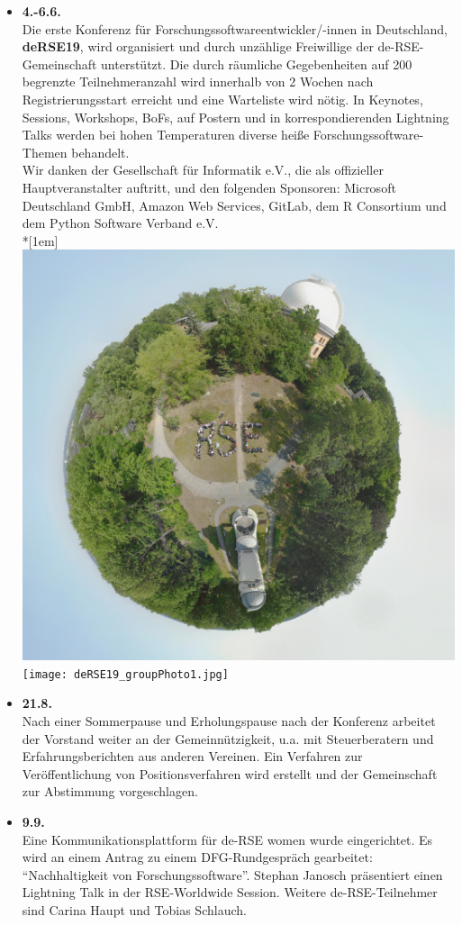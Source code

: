 \begin{itemize}
 \item \textbf{4.-6.6.}\\
 Die erste Konferenz für Forschungssoftwareentwickler/-innen in Deutschland, \textbf{deRSE19}, wird organisiert und durch unzählige Freiwillige der de-RSE-Gemeinschaft unterstützt. Die durch räumliche Gegebenheiten auf 200 begrenzte Teilnehmeranzahl wird innerhalb von 2 Wochen nach Registrierungsstart erreicht und eine Warteliste wird nötig. In Keynotes, Sessions, Workshops, BoFs, auf Postern und in korrespondierenden Lightning Talks werden bei hohen Temperaturen diverse heiße Forschungssoftware-Themen behandelt.\\
 Wir danken der Gesellschaft für Informatik e.V., die als offizieller Hauptveranstalter auftritt, und den folgenden Sponsoren: Microsoft Deutschland GmbH, Amazon Web Services, GitLab, dem R Consortium und dem Python Software Verband e.V.\\*[1em]
  \hspace*{.11\textwidth}\includegraphics[width=.71\textwidth]{deRSE19_littlePlanet.jpg}\\
  \hspace*{.11\textwidth}\texttt{[image: deRSE19\_groupPhoto1.jpg]}
 \item \textbf{21.8.}\\
 Nach einer Sommerpause und Erholungspause nach der Konferenz arbeitet der Vorstand weiter an der Gemeinnützigkeit, u.a. mit Steuerberatern und Erfahrungsberichten aus anderen Vereinen. Ein Verfahren zur Veröffentlichung von Positionsverfahren wird erstellt und der Gemeinschaft zur Abstimmung vorgeschlagen.
 \item \textbf{9.9.}\\
 Eine Kommunikationsplattform für de-RSE women wurde eingerichtet. Es wird an einem Antrag zu einem DFG-Rundgespräch gearbeitet: "`Nachhaltigkeit von Forschungssoftware"'. Stephan Janosch präsentiert einen Lightning Talk in der RSE-Worldwide Session. Weitere de-RSE-Teilnehmer sind Carina Haupt und Tobias Schlauch.

\end{itemize}
